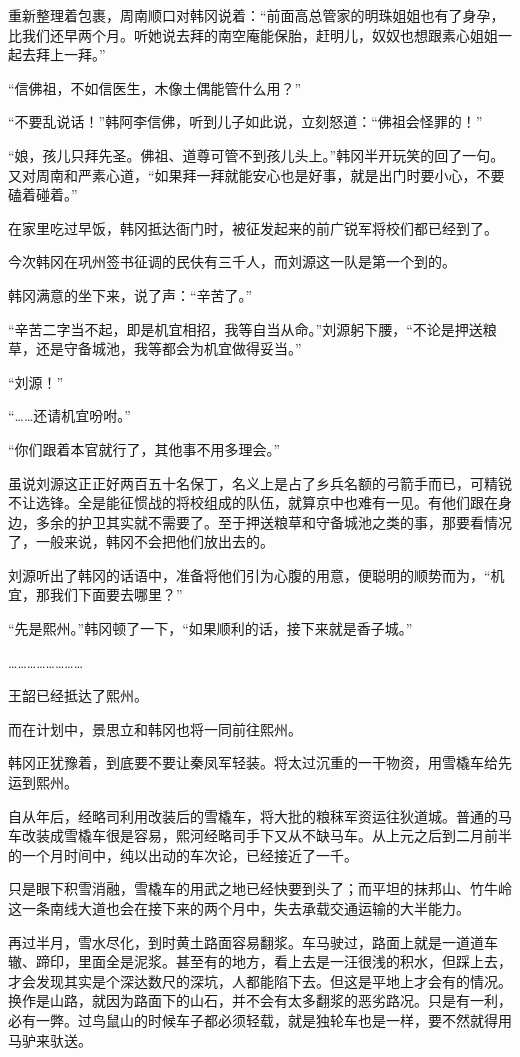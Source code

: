 重新整理着包裹，周南顺口对韩冈说着：“前面高总管家的明珠姐姐也有了身孕，比我们还早两个月。听她说去拜的南空庵能保胎，赶明儿，奴奴也想跟素心姐姐一起去拜上一拜。”

“信佛祖，不如信医生，木像土偶能管什么用？”

“不要乱说话！”韩阿李信佛，听到儿子如此说，立刻怒道：“佛祖会怪罪的！”

“娘，孩儿只拜先圣。佛祖、道尊可管不到孩儿头上。”韩冈半开玩笑的回了一句。又对周南和严素心道，“如果拜一拜就能安心也是好事，就是出门时要小心，不要磕着碰着。”

在家里吃过早饭，韩冈抵达衙门时，被征发起来的前广锐军将校们都已经到了。

今次韩冈在巩州签书征调的民伕有三千人，而刘源这一队是第一个到的。

韩冈满意的坐下来，说了声：“辛苦了。”

“辛苦二字当不起，即是机宜相招，我等自当从命。”刘源躬下腰，“不论是押送粮草，还是守备城池，我等都会为机宜做得妥当。”

“刘源！”

“……还请机宜吩咐。”

“你们跟着本官就行了，其他事不用多理会。”

虽说刘源这正正好两百五十名保丁，名义上是占了乡兵名额的弓箭手而已，可精锐不让选锋。全是能征惯战的将校组成的队伍，就算京中也难有一见。有他们跟在身边，多余的护卫其实就不需要了。至于押送粮草和守备城池之类的事，那要看情况了，一般来说，韩冈不会把他们放出去的。

刘源听出了韩冈的话语中，准备将他们引为心腹的用意，便聪明的顺势而为，“机宜，那我们下面要去哪里？”

“先是熙州。”韩冈顿了一下，“如果顺利的话，接下来就是香子城。”

……………………

王韶已经抵达了熙州。

而在计划中，景思立和韩冈也将一同前往熙州。

韩冈正犹豫着，到底要不要让秦凤军轻装。将太过沉重的一干物资，用雪橇车给先运到熙州。

自从年后，经略司利用改装后的雪橇车，将大批的粮秣军资运往狄道城。普通的马车改装成雪橇车很是容易，熙河经略司手下又从不缺马车。从上元之后到二月前半的一个月时间中，纯以出动的车次论，已经接近了一千。

只是眼下积雪消融，雪橇车的用武之地已经快要到头了；而平坦的抹邦山、竹牛岭这一条南线大道也会在接下来的两个月中，失去承载交通运输的大半能力。

再过半月，雪水尽化，到时黄土路面容易翻浆。车马驶过，路面上就是一道道车辙、蹄印，里面全是泥浆。甚至有的地方，看上去是一汪很浅的积水，但踩上去，才会发现其实是个深达数尺的深坑，人都能陷下去。但这是平地上才会有的情况。换作是山路，就因为路面下的山石，并不会有太多翻浆的恶劣路况。只是有一利，必有一弊。过鸟鼠山的时候车子都必须轻载，就是独轮车也是一样，要不然就得用马驴来驮送。

